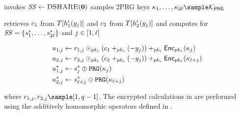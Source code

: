 \begin{algorithm}
\begin{algorithmic}[1]
\EndProcedure


\Statex\Procedure{\thresholdSearchBlocklist}{$\genericCInputSet \assign \{ \genericCInputElmt{\setIdx}\}_{\setIdx \in [1, \genericVecLen]}, \chtBlklistToken, \threshold$}



\State \client invokes $\mathit{SS} \gets \textsc{DSHARE}(\mathbf{0})$
\State \client samples 2\genericVecLen PRG keys $\prgSeed{1}, \dots, \prgSeed{2\genericVecLen} \sample \prgKeySpace$


\State \client retrieves $\ciphertext[1]$ from $\cuckooTable[\cuckooHashFn{1}(\genericCInputElmt{\projIdx})]$ and 
$\ciphertext[2]$ from $\cuckooTable[\cuckooHashFn{2}(\genericCInputElmt{\projIdx})]$ and computes for $\mathit{SS} = \{ s_1^{\ast}, \dots, s_{2\ell}^{\ast} \}$ and $j \in [1, \ell]$

\begin{align}
& \secretShareEncryption{1, \projIdx} \assign \genericRand[1, \projIdx] \homomorphicScalerMult{\encryptPubKey} (\ciphertext[1] \homomorphicAdd{\encryptPubKey}  ( - \genericCInputElmt{\projIdx})) \homomorphicAdd{\encryptPubKey} \pkencrypt[\encryptPubKey](\prgSeed{\projIdx})
\label{cht:homomorphic_add_1} \\ 
& \secretShareEncryption{2, \projIdx} \assign \genericRand[2, \projIdx] \homomorphicScalerMult{\encryptPubKey} (\ciphertext[2] \homomorphicAdd{\encryptPubKey}  ( - \genericCInputElmt{\projIdx})) \homomorphicAdd{\encryptPubKey} \pkencrypt[\encryptPubKey](\prgSeed{\genericVecLen + \projIdx})
\label{cht:homomorphic_add_2} \\ 
& \secretShareEncryption{1, \projIdx}^{\ast} \assign s_{\projIdx}^{\ast} \oplus \prg(\prgSeed{\projIdx}) \label{cht:prg_1}\\
& \secretShareEncryption{2, \projIdx}^{\ast} \assign s_{\genericVecLen + \projIdx}^{\ast} \oplus \prg(\prgSeed{\genericVecLen + \projIdx})\label{cht:prg_2} 
\end{align}

where $\genericRand[1, \projIdx], \genericRand[2, \projIdx] \sample [1, \groupOrder - 1]$. The encrypted calculations in  are performed using the additively homomorphic operators defined in . 


\EndFor


\end{algorithmic}
\end{algorithm}
